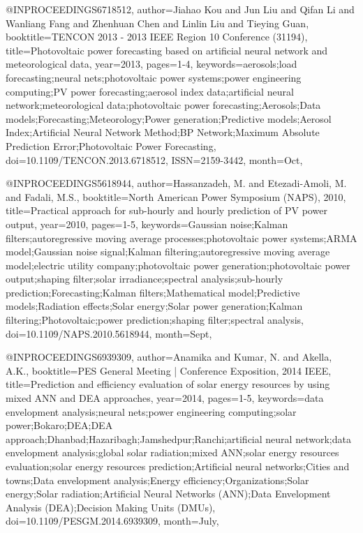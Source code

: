{@INPROCEEDINGS{6718512, 
author={Jiahao Kou and Jun Liu and Qifan Li and Wanliang Fang and Zhenhuan Chen and Linlin Liu and Tieying Guan}, 
booktitle={TENCON 2013 - 2013 IEEE Region 10 Conference (31194)}, 
title={Photovoltaic power forecasting based on artificial neural network and meteorological data}, 
year={2013}, 
pages={1-4}, 
keywords={aerosols;load forecasting;neural nets;photovoltaic power systems;power engineering computing;PV power forecasting;aerosol index data;artificial neural network;meteorological data;photovoltaic power forecasting;Aerosols;Data models;Forecasting;Meteorology;Power generation;Predictive models;Aerosol Index;Artificial Neural Network Method;BP Network;Maximum Absolute Prediction Error;Photovoltaic Power Forecasting}, 
doi={10.1109/TENCON.2013.6718512}, 
ISSN={2159-3442}, 
month={Oct},}

@INPROCEEDINGS{5618944, 
author={Hassanzadeh, M. and Etezadi-Amoli, M. and Fadali, M.S.}, 
booktitle={North American Power Symposium (NAPS), 2010}, 
title={Practical approach for sub-hourly and hourly prediction of PV power output}, 
year={2010}, 
pages={1-5}, 
keywords={Gaussian noise;Kalman filters;autoregressive moving average processes;photovoltaic power systems;ARMA model;Gaussian noise signal;Kalman filtering;autoregressive moving average model;electric utility company;photovoltaic power generation;photovoltaic power output;shaping filter;solar irradiance;spectral analysis;sub-hourly prediction;Forecasting;Kalman filters;Mathematical model;Predictive models;Radiation effects;Solar energy;Solar power generation;Kalman filtering;Photovoltaic;power prediction;shaping filter;spectral analysis}, 
doi={10.1109/NAPS.2010.5618944}, 
month={Sept},}

@INPROCEEDINGS{6939309, 
author={Anamika and Kumar, N. and Akella, A.K.}, 
booktitle={PES General Meeting | Conference Exposition, 2014 IEEE}, 
title={Prediction and efficiency evaluation of solar energy resources by using mixed ANN and DEA approaches}, 
year={2014}, 
pages={1-5}, 
keywords={data envelopment analysis;neural nets;power engineering computing;solar power;Bokaro;DEA;DEA approach;Dhanbad;Hazaribagh;Jamshedpur;Ranchi;artificial neural network;data envelopment analysis;global solar radiation;mixed ANN;solar energy resources evaluation;solar energy resources prediction;Artificial neural networks;Cities and towns;Data envelopment analysis;Energy efficiency;Organizations;Solar energy;Solar radiation;Artificial Neural Networks (ANN);Data Envelopment Analysis (DEA);Decision Making Units (DMUs)}, 
doi={10.1109/PESGM.2014.6939309}, 
month={July},}

}
